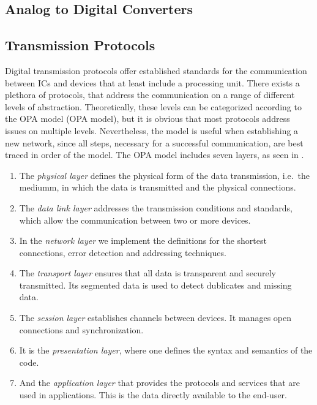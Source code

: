 \subsection{Analog to Digital Converters}

\subsection{Transmission Protocols}

Digital transmission protocols offer established standards for the communication between \ac{IC}s and devices that at least include a processing unit. There exists a plethora of protocols, that address the communication on a range of different levels of abstraction. Theoretically, these levels can be categorized according to the \acl{OPA} model (\acs{OPA} model), but it is obvious that most protocols address issues on multiple levels. Nevertheless, the model is useful when establishing a new network, since all steps, necessary for a successful communication, are best traced in order of the model. The \ac{OPA} model includes seven layers, as seen in .
\begin{enumerate}
  \item The \emph{physical layer} defines the physical form of the data transmission, i.e.\ the mediumm, in which the data is transmitted and the physical connections.
  \item The \emph{data link layer} addresses the transmission conditions and standards, which allow the communication between two or more devices.
  \item In the \emph{network layer} we implement the definitions for the shortest connections, error detection and addressing techniques.
  \item The \emph{transport layer} ensures that all data is transparent and securely transmitted. Its segmented data is used to detect dublicates and missing data.
  \item The \emph{session layer} establishes channels between devices. It manages open connections and synchronization.
  \item It is the \emph{presentation layer}, where one defines the syntax and semantics of the code.
  \item And the \emph{application layer} that provides the protocols and services that are used in applications. This is the data directly available to the end-user.
\end{enumerate}

